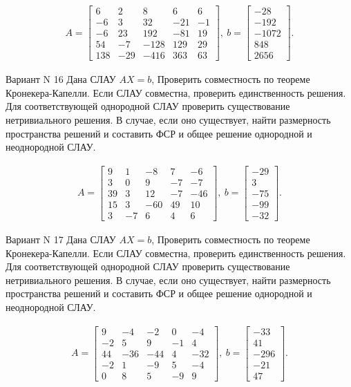 \documentclass[11pt]{report}
\begin{document}
\begin{align*}
 A = \left[\begin{matrix}6 & 2 & 8 & 6 & 6\\-6 & 3 & 32 & -21 & -1\\-6 & 23 & 192 & -81 & 19\\54 & -7 & -128 & 129 & 29\\138 & -29 & -416 & 363 & 63\end{matrix}\right],
\ b = \left[\begin{matrix}-28\\-192\\-1072\\848\\2656\end{matrix}\right]. 
 \end{align*}

Вариант N 16
Дана СЛАУ $AX = b$,
Проверить совместность по теореме Кронекера-Капелли. Если СЛАУ совместна, проверить единственность решения.
Для соответствующей однородной СЛАУ проверить существование нетривиального решения. В случае, если оно существует,
найти размерность пространства решений и составить ФСР и общее решение однородной  и неоднородной СЛАУ.


\begin{align*}
 A = \left[\begin{matrix}9 & 1 & -8 & 7 & -6\\3 & 0 & 9 & -7 & -7\\39 & 3 & 12 & -7 & -46\\15 & 3 & -60 & 49 & 10\\3 & -7 & 6 & 4 & 6\end{matrix}\right],
\ b = \left[\begin{matrix}-29\\3\\-75\\-99\\-32\end{matrix}\right]. 
 \end{align*}

Вариант N 17
Дана СЛАУ $AX = b$,
Проверить совместность по теореме Кронекера-Капелли. Если СЛАУ совместна, проверить единственность решения.
Для соответствующей однородной СЛАУ проверить существование нетривиального решения. В случае, если оно существует,
найти размерность пространства решений и составить ФСР и общее решение однородной  и неоднородной СЛАУ.


\begin{align*}
 A = \left[\begin{matrix}9 & -4 & -2 & 0 & -4\\-2 & 5 & 9 & -1 & 4\\44 & -36 & -44 & 4 & -32\\-2 & 1 & -9 & 5 & -4\\0 & 8 & 5 & -9 & 9\end{matrix}\right],
\ b = \left[\begin{matrix}-33\\41\\-296\\-21\\47\end{matrix}\right]. 
 \end{align*}
\end{document}
